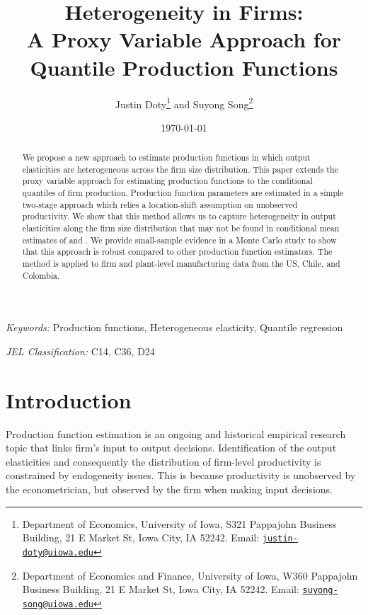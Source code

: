 \documentclass[11pt]{article}
\begin{document}
\title{Heterogeneity in Firms: \\
A Proxy Variable Approach for Quantile Production Functions
}

\author{Justin Doty\thanks{Department of Economics, University of Iowa, S321 Pappajohn Business Building, 21 E Market St, Iowa City, IA 52242. Email: \href{mailto:justin-doty@uiowa.edu}{\texttt{justin-doty@uiowa.edu}}} and Suyong Song\thanks{Department of Economics and Finance, University of Iowa, W360 Pappajohn Business Building, 21 E Market St, Iowa City, IA 52242. Email: \href{mailto:suyong-song@uiowa.edu}{\texttt{suyong-song@uiowa.edu}}}
}

\date {\today}
\maketitle


\begin{abstract}
We propose a new approach to estimate production functions in which output elasticities are heterogeneous across the firm size distribution. 
This paper extends the proxy variable approach for estimating production functions to the conditional quantiles of firm production. Production function parameters are estimated in a simple two-stage approach which relies a location-shift assumption on unobserved productivity. We show that this method allows us to capture heterogeneity in output elasticities along the firm size distribution that may not be found in conditional mean estimates of \cite{Olley1996} and \cite{Levinsohn2003}. We provide small-sample evidence in a Monte Carlo study to show that this approach is robust compared to other production function estimators. The method is applied to firm and plant-level manufacturing data from the US, Chile, and Colombia.
\end{abstract}


\textit{Keywords:} Production functions, Heterogeneous elasticity, Quantile regression

\textit{JEL Classification:} C14, C36, D24



\baselineskip25pt

\onehalfspacing

\section{Introduction}

Production function estimation is an ongoing and historical empirical research topic that links firm's input to output decisions. Identification of the output elasticities and consequently the distribution of firm-level productivity is constrained by endogeneity issues. This is because productivity is unobserved by the econometrician, but observed by the firm when making input decisions. 
\end{document}
